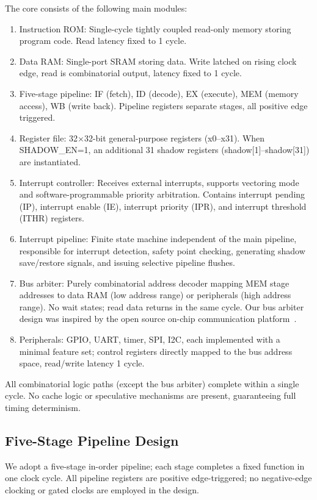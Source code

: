 \documentclass[letterpaper,journal]{IEEEtran}
\begin{document}
The core consists of the following main modules:
\begin{enumerate}
\item Instruction ROM: Single-cycle tightly coupled read-only memory storing program code. Read latency fixed to 1 cycle.
\item Data RAM: Single-port SRAM storing data. Write latched on rising clock edge, read is combinatorial output, latency fixed to 1 cycle.
\item Five-stage pipeline: IF (fetch), ID (decode), EX (execute), MEM (memory access), WB (write back). Pipeline registers separate stages, all positive edge triggered.
\item Register file: 32$\times$32-bit general-purpose registers (x0--x31). When SHADOW\_EN=1, an additional 31 shadow registers (shadow[1]--shadow[31]) are instantiated.
\item Interrupt controller: Receives external interrupts, supports vectoring mode and software-programmable priority arbitration. Contains interrupt pending (IP), interrupt enable (IE), interrupt priority (IPR), and interrupt threshold (ITHR) registers.
\item Interrupt pipeline: Finite state machine independent of the main pipeline, responsible for interrupt detection, safety point checking, generating shadow save/restore signals, and issuing selective pipeline flushes.
\item Bus arbiter: Purely combinatorial address decoder mapping MEM stage addresses to data RAM (low address range) or peripherals (high address range). No wait states; read data returns in the same cycle. Our bus arbiter design was inspired by the open source on-chip communication platform~\cite{ref16}.
\item Peripherals: GPIO, UART, timer, SPI, I2C, each implemented with a minimal feature set; control registers directly mapped to the bus address space, read/write latency 1 cycle.
\end{enumerate}

All combinatorial logic paths (except the bus arbiter) complete within a single cycle.
No cache logic or speculative mechanisms are present, guaranteeing full timing determinism.

\subsection{Five-Stage Pipeline Design}
We adopt a five-stage in-order pipeline; each stage completes a fixed function in one clock cycle.
All pipeline registers are positive edge-triggered; no negative-edge clocking or gated clocks are employed in the design.
\end{document}
